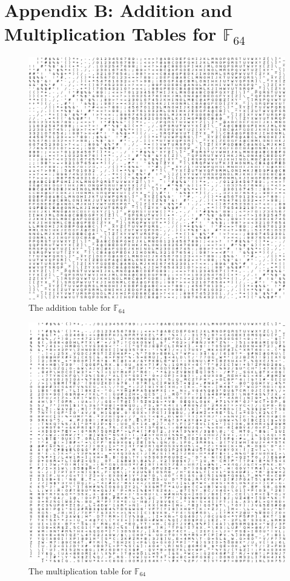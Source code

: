 \documentclass{article}
\begin{document}
\section{Appendix B: Addition and Multiplication Tables for $\mathbb{F}_{64}$}
	\begin{figure}
	\centering
	\includegraphics[height=\textheight,center]{AddTable}
	\caption{The addition table for $\mathbb{F}_{64}$}
	\label{fig:AddTable}
	\end{figure}
	
	\begin{figure}
	\centering
	\includegraphics[height=\textheight,center]{MultTable}
	\caption{The multiplication table for $\mathbb{F}_{64}$}
	\label{fig:MultTable}
	\end{figure}
	
\end{document}
